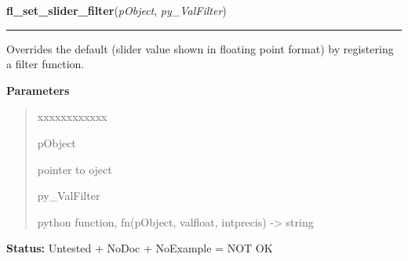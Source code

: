 \hspace{.8\funcindent}\begin{boxedminipage}{\funcwidth}

    \raggedright \textbf{fl\_set\_slider\_filter}(\textit{pObject}, \textit{py\_ValFilter})

    \vspace{-1.5ex}

    \rule{\textwidth}{0.5\fboxrule}
\setlength{\parskip}{2ex}
    Overrides the default (slider value shown in floating point format) by 
    registering a filter function.

\setlength{\parskip}{1ex}
      \textbf{Parameters}
      \vspace{-1ex}

      \begin{quote}
        \begin{Ventry}{xxxxxxxxxxxx}

          \item[pObject]

          pointer to oject

          \item[py\_ValFilter]

          python function, fn(pObject, valfloat, intprecis) -{\textgreater}
          string

        \end{Ventry}

      \end{quote}

\textbf{Status:} Untested + NoDoc + NoExample = NOT OK



    \end{boxedminipage}

    \label{xformslib:library:fl_create_spinner}

    \vspace{0.5ex}

